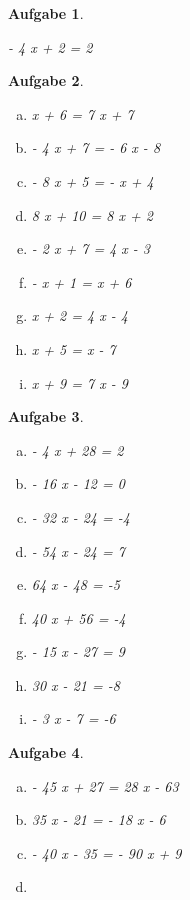 \documentclass[12pt,fleqn]{article}
\theoremstyle{aufg}
\newtheorem{aufgabe}{Aufgabe}
\theoremstyle{bsp}
\begin{document}
\begin{flushleft}
\begin{aufgabe}
\begin{multicols}{3}
\begin{enumerate}[a)]
- 4 x + 2 = 2
\end{enumerate} 
\end{multicols} 
\end{aufgabe} 
\begin{aufgabe} ~ \\ 
\begin{multicols}{3} 
\begin{enumerate}[a)] 
\item 
x + 6 = 7 x + 7
\item 
- 4 x + 7 = - 6 x - 8
\item 
- 8 x + 5 = - x + 4
\item 
8 x + 10 = 8 x + 2
\item 
- 2 x + 7 = 4 x - 3
\item 
- x + 1 = x + 6
\item 
x + 2 = 4 x - 4
\item 
x + 5 = x - 7
\item 
x + 9 = 7 x - 9
\end{enumerate} 
\end{multicols} 
\end{aufgabe} 
\begin{aufgabe} ~ \\ 
\begin{multicols}{3} 
\begin{enumerate}[a)] 
\item 
- 4 x + 28 = 2
\item 
- 16 x - 12 = 0
\item 
- 32 x - 24 = -4
\item 
- 54 x - 24 = 7
\item 
64 x - 48 = -5
\item 
40 x + 56 = -4
\item 
- 15 x - 27 = 9
\item 
30 x - 21 = -8
\item 
- 3 x - 7 = -6
\end{enumerate} 
\end{multicols} 
\end{aufgabe} 
\begin{aufgabe} ~ \\ 
\begin{multicols}{2} 
\begin{enumerate}[a)] 
\item 
- 45 x + 27 = 28 x - 63
\item 
35 x - 21 = - 18 x - 6
\item 
- 40 x - 35 = - 90 x + 9
\item 

\end{enumerate}
\end{multicols}
\end{aufgabe}
\end{flushleft}
\end{document}
